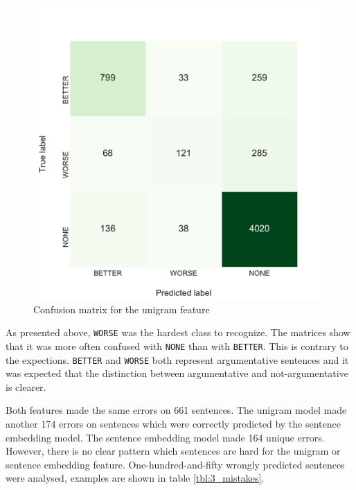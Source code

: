 \begin{figure}[h]
\begin{minipage}{.5\linewidth}
     \caption{Confusion matrix for the unigram feature} 
       \label{fig:3_conf_uni}
 \centering
	\includegraphics[width=1\linewidth]{images/experiments/conf-Unigrams_False}
    \end{minipage} 
\end{figure}

As presented above, \texttt{WORSE} was the hardest class to recognize. The matrices show that it was more often confused with \texttt{NONE} than with \texttt{BETTER}. This is contrary to the expections. \texttt{BETTER} and \texttt{WORSE} both represent argumentative sentences and it was expected that the distinction between argumentative and not-argumentative is clearer. 

Both features made the same errors on 661 sentences. The unigram model made another 174 errors on sentences which were correctly predicted by the sentence embedding model. The sentence embedding model made 164 unique errors. However, there is no clear pattern which sentences are hard for the unigram or sentence embedding feature. One-hundred-and-fifty wrongly predicted sentences were analysed, examples are shown in table \ref{tbl:3_mistakes}. 


